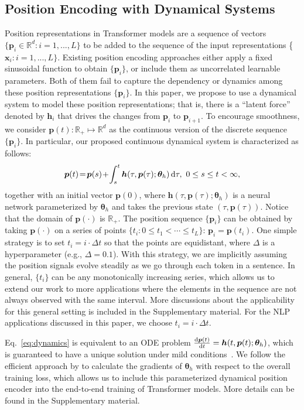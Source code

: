 \documentclass[11pt]{article}
\def\vtheta{{\bm{\theta}}}
\def\vh{{\bm{h}}}
\def\vp{{\bm{p}}}
\def\vx{{\bm{x}}}
\def\sR{{\mathbb{R}}}
\begin{document}
\subsection{Position Encoding with Dynamical Systems}
\label{sec:modeling}
Position representations in Transformer models are a sequence of 
vectors $\{\vp_i \in \sR^d: i = 1,...,L\}$ to be added to the sequence 
of the input representations \{$\vx_i:i=1,...,L\}$. 
Existing position encoding approaches either apply a fixed sinusoidal function to obtain $\{\vp_i\}$, or include them as uncorrelated learnable parameters. 
Both of them fail to capture the dependency or dynamics among these position representations $\{\vp_i\}$. 
In this paper, we propose to use a dynamical system to model these position representations; that is, 
there is a ``latent force'' denoted by $\vh_i$ that drives the changes from $\vp_i$ to $\vp_{i+1}$.  
To encourage smoothness, we consider $\vp(t):\sR_+\mapsto \sR^d$ as the continuous version of the 
discrete sequence $\{\vp_i\}$. In particular, our proposed continuous dynamical system is characterized as follows:
\begin{equation}
    \vp(t)\!=\!\vp(s)\!+\!\int_s^t\vh(\tau, \vp({\tau});\vtheta_h)\dif \tau,\ 0\le s\le t<\infty,
    \label{eq:dynamics}
\end{equation}
together with an initial vector $\vp(0)$, where $\vh(\tau, \vp({\tau});\vtheta_h)$ is a neural network 
parameterized by $\vtheta_h$ and takes the previous state $(\tau, \vp(\tau))$. Notice that the domain of 
$\vp(\cdot)$ is $\sR_+$. The position sequence $\{\vp_i\}$ can be obtained by taking $\vp(\cdot)$ on a series of points $\{t_i: 0 \le t_1 < \cdots \le t_L\}$: $\vp_i=\vp(t_i)$.
One simple strategy is to set $t_i=i\cdot\Delta t$ so that the points are equidistant, where $\Delta$ is a hyperparameter (e.g., $\Delta=0.1$). 
With this strategy, we are implicitly assuming the position signals evolve steadily as we go through each token in a sentence. 
In general, $\{t_i\}$ can be any monotonically increasing series, which allows us to extend our work to more applications where the elements in the sequence are not always observed with the same interval. More discussions about the applicability for this general setting is included in the Supplementary material. For the NLP applications discussed in this paper, we choose $t_i=i\cdot \Delta t$.
\par
Eq.~\eqref{eq:dynamics} is equivalent to an ODE problem $\frac{\dif \vp(t)}{\dif t}=\vh(t,\vp(t);\vtheta_h)$, which is guaranteed to have a unique solution under mild conditions~\cite{clark1964ordinary}. We follow the efficient approach by \cite{chen2018neural} to calculate the gradients of $\vtheta_h$ with respect to the overall training loss, which allows us to include this parameterized dynamical position encoder into the end-to-end training of Transformer models. More details can be found in the Supplementary material.
\end{document}

